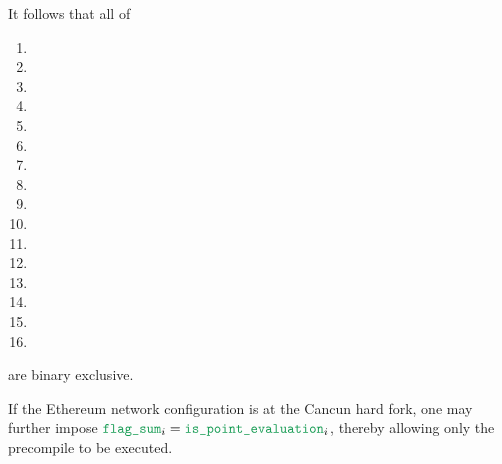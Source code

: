 \saNote{} \label{bls: generalities: flag sum: binary exclusivity}
It follows that all of
\begin{multicols}{2}
	\begin{enumerate}
		\item \isPointEvaluationData{}
		\item \isBlsGOneAddData{}
		\item \isBlsGOneMsmData{}
		\item \isBlsGTwoAddData{}
		\item \isBlsGTwoMsmData{}
		\item \isBlsPairingCheckData{}
		\item \isBlsMapFpToGOneData{}
		\item \isBlsMapFpTwoToGTwoData{}
		\item \isPointEvaluationResult{}
		\item \isBlsGOneAddResult{}
		\item \isBlsGOneMsmResult{}
		\item \isBlsGTwoAddResult{}
		\item \isBlsGTwoMsmResult{}
		\item \isBlsPairingCheckResult{}
		\item \isBlsMapFpToGOneResult{}
		\item \isBlsMapFpTwoToGTwoResult{}
	\end{enumerate}
\end{multicols}
\noindent are binary exclusive.

\saNote{} \label{bls: generalities: flag sum: only allow point evaluation for Cancun}
If the Ethereum network configuration is at the Cancun hard fork, one may further impose $\locFlagSum _{i} = \locIsPointEvaluation _{i}$,
thereby allowing only the \instPointEvaluation{} precompile to be executed.